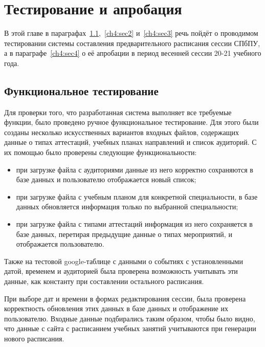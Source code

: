 \chapter{Тестирование и апробация} \label{ch4}

В этой главе в параграфах~\ref{ch4:sec1},~\ref{ch4:sec2} и~\ref{ch4:sec3} речь пойдёт о проводимом тестировании системы составления предварительного расписания сессии СПбПУ, а в параграфе~\ref{ch4:sec4} о её апробации в период весенней сессии 20-21 учебного года.


\section{Функциональное тестирование} \label{ch4:sec1}
Для проверки того, что разработанная система выполняет все требуемые функции, было проведено ручное функциональное тестирование. Для этого были созданы несколько искусственных вариантов входных файлов, содержащих данные о типах аттестаций, учебных планах направлений и список аудиторий. С их помощью было проверены следующие функциональности:
\begin{itemize}
	\item при загрузке файла с аудиториями данные из него корректно сохраняются в базе данных и пользователю отображается новый список;
	\item при загрузке файла с учебным планом для конкретной специальности, в базе данных обновляется информация только по выбранной специальности;
	\item при загрузке файла с типами аттестаций информация из него сохраняется в базе данных, перетирая предыдущие данные о типах мероприятий, и отображается пользователю.
\end{itemize} 	

Также на тестовой google-таблице с данными о событиях с установленными датой, временем и аудиторией была проверена возможность учитывать эти данные, как константу при составлении остального расписания.

При выборе дат и времени в формах редактирования сессии, была проверена корректность обновления этих данных в базе данных и отображение их пользователю. Входные данные подбирались таким образом, чтобы было видно, что данные с сайта с расписанием учебных занятий \cite{ruz} учитываются при генерации нового расписания.

